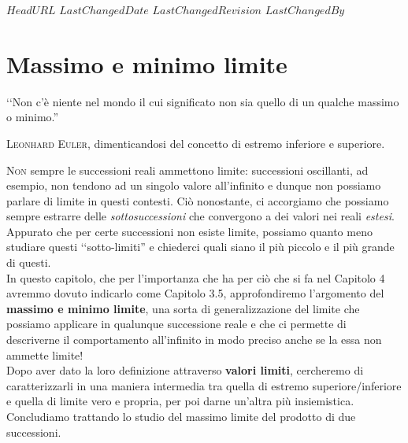 \svnidlong
{$HeadURL$}
{$LastChangedDate$}
{$LastChangedRevision$}
{$LastChangedBy$}

\chapter{Massimo e minimo limite}

\begin{introduction}
	‘‘Non c'è niente nel mondo il cui significato non sia quello di un qualche massimo o minimo.''
	\begin{flushright}
		\textsc{Leonhard Euler,} dimenticandosi del concetto di estremo inferiore e superiore.
	\end{flushright}
\end{introduction}
\lettrine[findent=1pt, nindent=0pt]{N}{on} sempre le successioni reali ammettono limite: successioni oscillanti, ad esempio, non tendono ad un singolo valore all'infinito e dunque non possiamo parlare di limite in questi contesti. Ciò nonostante, ci accorgiamo che possiamo sempre estrarre delle \textit{sottosuccessioni} che convergono a dei valori nei reali \textit{estesi}. Appurato che per certe successioni non esiste limite, possiamo quanto meno studiare questi ‘‘sotto-limiti'' e chiederci quali siano il più piccolo e il più grande di questi.\\
In questo capitolo, che per l'importanza che ha per ciò che si fa nel Capitolo 4 avremmo dovuto indicarlo come Capitolo 3.5, approfondiremo l'argomento del \textbf{massimo e minimo limite}, una sorta di generalizzazione del limite che possiamo applicare in qualunque successione reale e che ci permette di descriverne il comportamento all'infinito in modo preciso anche se la essa non ammette limite!\\
Dopo aver dato la loro definizione attraverso \textbf{valori limiti}, cercheremo di caratterizzarli in una maniera intermedia tra quella di estremo superiore/inferiore e quella di limite vero e propria, per poi darne un'altra più insiemistica. Concludiamo trattando lo studio del massimo limite del prodotto di due successioni.
